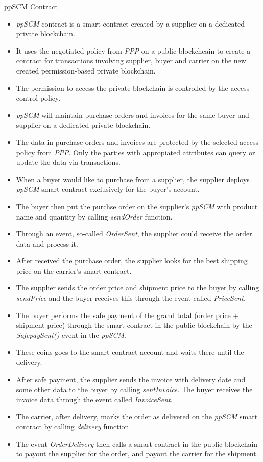 \documentclass[11pt]{beamer}
\begin{document}
\begin{frame}[allowframebreaks]{ppSCM Contract}

\begin{itemize}

\item \textit{ppSCM} contract is a smart contract created by a supplier on a dedicated private blockchain.
\item It uses the negotiated policy from \textit{PPP} on a public blockchcain to create a contract for transactions involving supplier, buyer and carrier on the new created permission-based private blockchain.
\item The permission to access the private blockchain is controlled by the access control policy.
\item \textit{ppSCM} will maintain purchase orders and invoices for the same buyer and supplier on a dedicated private blockchain.
\item The data in purchase orders and invoices are protected by the selected access policy from \textit{PPP}. Only the parties with appropiated attributes can query or update the data via transactions.
\item When a buyer would like to purchase from a supplier, the supplier deploys \textit{ppSCM} smart contract exclusively for the buyer's account.
\item The buyer then put the purchse order on the supplier's \textit{ppSCM} with product name and quantity by calling \textit{sendOrder} function.
\item Through an event, so-called \textit{OrderSent}, the supplier could receive the order data and process it.
\item After received the purchase order, the supplier looks for the best shipping price on the carrier's smart contract.
\item The supplier sends the order price and shipment price to the buyer by calling \textit{sendPrice} and the buyer receives this through the event called \textit{PriceSent}.
\item The buyer performs the safe payment of the grand total (order price + shipment price) through the smart contract in the public blockchain by the \textit{SafepaySent()} event in the \textit{ppSCM}.
\item These coins goes to the smart contract account and waits there until the delivery.
\item After safe payment, the supplier sends the invoice with delivery date and some other data to the buyer by calling \textit{sentInvoice}. The buyer receives the invoice data through the event called \textit{InvoiceSent}.
\item The carrier, after delivery, marks the order as delivered on the \textit{ppSCM} smart contract by calling \textit{delivery} function.
\item The event \textit{OrderDelivery} then calls a smart contract in the public blockchain to payout the supplier for the order, and payout the carrier for the shipment.

\end{itemize}
\end {frame}
\end{document}
